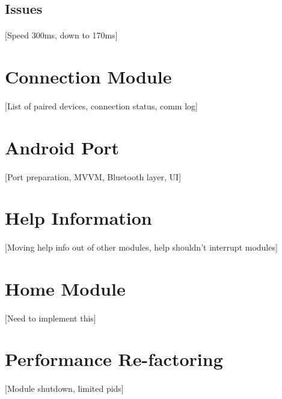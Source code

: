 	\subsection{Issues}{		
		\paragraph{}{
		[Speed 300ms, down to 170ms]
		}
		\label{ssec:DataModuleIssues}
	}

\section{Connection Module}
		\paragraph{}{
		[List of paired devices, connection status, comm log]
		}
	
\section{Android Port}
		\paragraph{}{
		[Port preparation, MVVM, Bluetooth layer, UI]
		}	

\section{Help Information}
		\paragraph{}{
		[Moving help info out of other modules, help shouldn't interrupt modules]
		}
	
\section{Home Module}
		\paragraph{}{
		[Need to implement this]
		}
	
\section{Performance Re-factoring}
		\paragraph{}{
		[Module shutdown, limited pids]
		}
	
